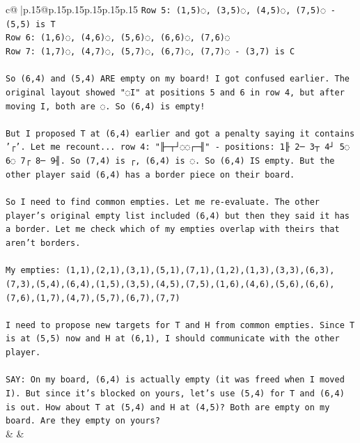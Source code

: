 \documentclass{article}
\begin{document}
{\begin{supertabular}{c@{$\;$}|p{.15\linewidth}@{}p{.15\linewidth}p{.15\linewidth}p{.15\linewidth}p{.15\linewidth}p{.15\linewidth}}
{{{\texttt{Row 5: (1,5)◌, (3,5)◌, (4,5)◌, (7,5)◌ {-} (5,5) is T} \\
\texttt{Row 6: (1,6)◌, (4,6)◌, (5,6)◌, (6,6)◌, (7,6)◌} \\
\texttt{Row 7: (1,7)◌, (4,7)◌, (5,7)◌, (6,7)◌, (7,7)◌ {-} (3,7) is C} \\
\\ 
\texttt{So (6,4) and (5,4) ARE empty on my board! I got confused earlier. The original layout showed "◌I" at positions 5 and 6 in row 4, but after moving I, both are ◌. So (6,4) is empty!} \\
\\ 
\texttt{But I proposed T at (6,4) earlier and got a penalty saying it contains '┌'. Let me recount... row 4: "╟─┬┘◌◌┌─╢" {-} positions: 1╟ 2─ 3┬ 4┘ 5◌ 6◌ 7┌ 8─ 9╢. So (7,4) is ┌, (6,4) is ◌. So (6,4) IS empty. But the other player said (6,4) has a border piece on their board.} \\
\\ 
\texttt{So I need to find common empties. Let me re{-}evaluate. The other player's original empty list included (6,4) but then they said it has a border. Let me check which of my empties overlap with theirs that aren't borders.} \\
\\ 
\texttt{My empties: (1,1),(2,1),(3,1),(5,1),(7,1),(1,2),(1,3),(3,3),(6,3),(7,3),(5,4),(6,4),(1,5),(3,5),(4,5),(7,5),(1,6),(4,6),(5,6),(6,6),(7,6),(1,7),(4,7),(5,7),(6,7),(7,7)} \\
\\ 
\texttt{I need to propose new targets for T and H from common empties. Since T is at (5,5) now and H at (6,1), I should communicate with the other player.} \\
\\ 
\texttt{SAY: On my board, (6,4) is actually empty (it was freed when I moved I). But since it's blocked on yours, let's use (5,4) for T and (6,4) is out. How about T at (5,4) and H at (4,5)? Both are empty on my board. Are they empty on yours?} \\
            }
        }
    }
    & & \\ \\


\end{supertabular}}
\end{document}
